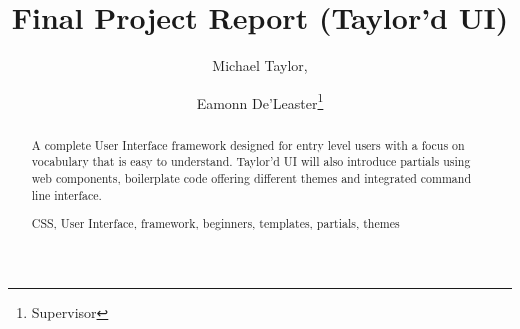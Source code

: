 \documentclass[runningheads,a4paper]{llncs}
\newcommand{\keywords}[1]{\par\addvspace\baselineskip
\noindent\keywordname\enspace\ignorespaces#1}
\begin{document}
\mainmatter  %

\title{Final Project Report (Taylor'd UI)}


%
%
\author{Michael Taylor,%
\and Eamonn De'Leaster\thanks{Supervisor}}
%


%
%
\maketitle

%
\begin{abstract}

A complete User Interface framework designed for entry level users with a focus on vocabulary that is easy to understand. Taylor'd UI will also introduce partials using web components, boilerplate code offering different themes and integrated command line interface.
\keywords{CSS, User Interface, framework, beginners, templates, partials, themes}
\end{abstract}
%

%
%
%
\newpage
\tableofcontents
%
\renewcommand*{\glsclearpage}{}
\end{document}

